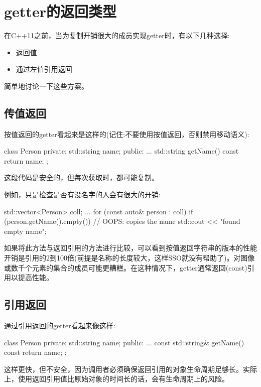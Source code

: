 \section{getter的返回类型}
在C++11之前，当为复制开销很大的成员实现getter时，有以下几种选择:

\begin{itemize}
	\item 返回值
	\item 通过左值引用返回
\end{itemize}

简单地讨论一下这些方案。

\subsection{传值返回}

按值返回的getter看起来是这样的(记住:不要使用按值返回，否则禁用移动语义):

\begin{cppcode}
class Person
{
private:
	std::string name;
public:
	...
	std::string getName() const {
		return name;
	}
};
\end{cppcode}

这段代码是安全的，但每次获取时，都可能复制。

例如，只是检查是否有没名字的人会有很大的开销:

\begin{cppcode}
std::vector<Person> coll;
...
for (const auto& person : coll) {
	if (person.getName().empty()) { // OOPS: copies the name
		std::cout << "found empty name\n";
	}
}
\end{cppcode}

如果将此方法与返回引用的方法进行比较，可以看到按值返回字符串的版本的性能开销是引用的2到100倍(前提是名称的长度较大，这样SSO就没有帮助了)。对图像或数千个元素的集合的成员可能更糟糕。在这种情况下，getter通常返回(const)引用以提高性能。

\subsection{引用返回}

通过引用返回的getter看起来像这样:

\begin{cppcode}
class Person
{
private:
	std::string name;
public:
	...
	const std::string& getName() const {
		return name;
	}
};
\end{cppcode}

这样更快，但不安全，因为调用者必须确保返回引用的对象生命周期足够长。实际上，使用返回引用值比原始对象的时间长的话，会有生命周期上的风险。

